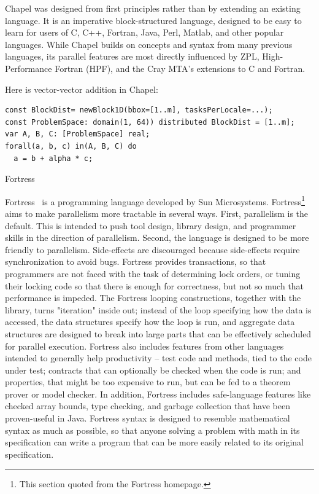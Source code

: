 Chapel was designed from first principles rather than by extending an
existing language. It is an imperative block-structured language,
designed to be easy to learn for users of C, C++, Fortran, Java, Perl,
Matlab, and other popular languages. While Chapel builds on concepts
and syntax from many previous languages, its parallel features are
most directly influenced by ZPL, High-Performance Fortran (HPF), and
the Cray MTA's extensions to C and Fortran.

Here is vector-vector addition in Chapel:
\begin{verbatim}
const BlockDist= newBlock1D(bbox=[1..m], tasksPerLocale=...);
const ProblemSpace: domain(1, 64)) distributed BlockDist = [1..m];
var A, B, C: [ProblemSpace] real;
forall(a, b, c) in(A, B, C) do
  a = b + alpha * c;
\end{verbatim}


 {Fortress}

Fortress~\cite{Fortress:homepage} is a programming language developed
by Sun Microsystems.  Fortress\footnote{This section quoted from the
  Fortress homepage.} aims to make parallelism more tractable
in several ways. First, parallelism is the default. This is intended
to push tool design, library design, and programmer skills in the
direction of parallelism. Second, the language is designed to be more
friendly to parallelism. Side-effects are discouraged because
side-effects require synchronization to avoid bugs. Fortress provides
transactions, so that programmers are not faced with the task of
determining lock orders, or tuning their locking code so that there is
enough for correctness, but not so much that performance is
impeded. The Fortress looping constructions, together with the
library, turns "iteration" inside out; instead of the loop specifying
how the data is accessed, the data structures specify how the loop is
run, and aggregate data structures are designed to break into large
parts that can be effectively scheduled for parallel
execution. Fortress also includes features from other languages
intended to generally help productivity -- test code and methods, tied
to the code under test; contracts that can optionally be checked when
the code is run; and properties, that might be too expensive to run,
but can be fed to a theorem prover or model checker. In addition,
Fortress includes safe-language features like checked array bounds,
type checking, and garbage collection that have been proven-useful in
Java. Fortress syntax is designed to resemble mathematical syntax as
much as possible, so that anyone solving a problem with math in its
specification can write a program that can be more easily related to
its original specification.

